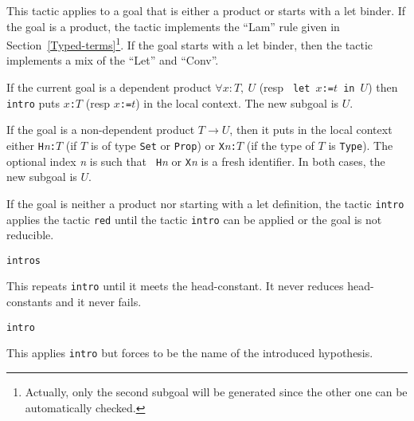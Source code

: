 \begin{coq_example*}
This tactic applies to a goal that is either a product or starts with
a let binder. If the goal is a product, the tactic implements the
``Lam'' rule given in
Section~\ref{Typed-terms}\footnote{Actually, only the second subgoal will be
generated since the other one can be automatically checked.}.  If the
goal starts with a let binder, then the tactic implements a mix of the
``Let'' and ``Conv''.

If the current goal is a dependent product $\forall x:T,~U$ (resp {\tt
let $x$:=$t$ in $U$}) then {\tt intro} puts {\tt $x$:$T$} (resp {\tt $x$:=$t$})
 in the local context.
The new subgoal is $U$.

If the goal is a non-dependent product $T \to U$, then it puts
in the local context either {\tt H}{\it n}{\tt :$T$} (if $T$ is of
type {\tt Set} or {\tt Prop}) or {\tt X}{\it n}{\tt :$T$} (if the type
of $T$ is {\tt Type}). The optional index {\it n} is such that {\tt
H}{\it n} or {\tt X}{\it n} is a fresh identifier.
In both cases, the new subgoal is $U$.

If the goal is neither a product nor starting with a let definition,
the tactic {\tt intro} applies the tactic {\tt red} until the tactic
{\tt intro} can be applied or the goal is not reducible.

\begin{ErrMsgs}
\item {}
\item {}
\end{ErrMsgs}

\begin{Variants}

\item {\tt intros}

  This repeats {\tt intro} until it meets the head-constant. It never reduces
  head-constants and it never fails.

\item {\tt intro {\ident}}

  This applies {\tt intro} but forces {\ident} to be the name of the
  introduced hypothesis.


\end{Variants}
\end{coq_example*}
